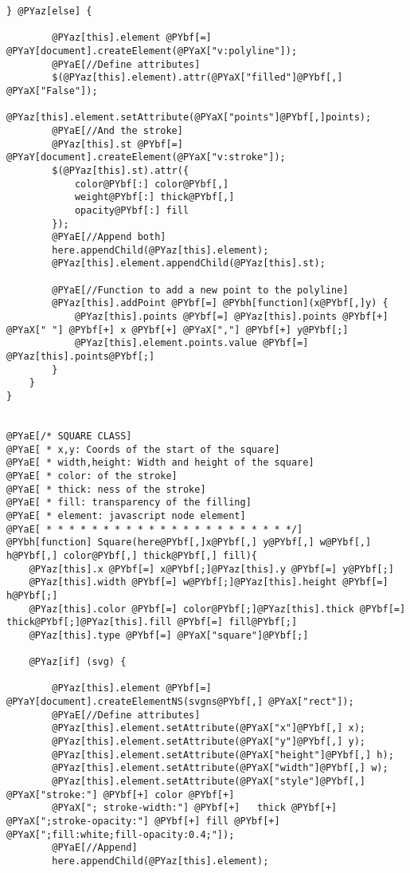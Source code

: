 \begin{Verbatim}[commandchars=@\[\]]
    } @PYaz[else] {
		
        @PYaz[this].element @PYbf[=] @PYaY[document].createElement(@PYaX["v:polyline"]);
		@PYaE[//Define attributes]
        $(@PYaz[this].element).attr(@PYaX["filled"]@PYbf[,] @PYaX["False"]);
        @PYaz[this].element.setAttribute(@PYaX["points"]@PYbf[,]points);
		@PYaE[//And the stroke]
        @PYaz[this].st @PYbf[=] @PYaY[document].createElement(@PYaX["v:stroke"]);
        $(@PYaz[this].st).attr({
            color@PYbf[:] color@PYbf[,]
            weight@PYbf[:] thick@PYbf[,]
            opacity@PYbf[:] fill
        });
		@PYaE[//Append both]
		here.appendChild(@PYaz[this].element);
		@PYaz[this].element.appendChild(@PYaz[this].st);
		
		@PYaE[//Function to add a new point to the polyline]
		@PYaz[this].addPoint @PYbf[=] @PYbh[function](x@PYbf[,]y) {
			@PYaz[this].points @PYbf[=] @PYaz[this].points @PYbf[+] @PYaX[" "] @PYbf[+] x @PYbf[+] @PYaX[","] @PYbf[+] y@PYbf[;]
			@PYaz[this].element.points.value @PYbf[=] @PYaz[this].points@PYbf[;]
		}
    }
}


@PYaE[/* SQUARE CLASS]
@PYaE[ * x,y: Coords of the start of the square]
@PYaE[ * width,height: Width and height of the square]
@PYaE[ * color: of the stroke]
@PYaE[ * thick: ness of the stroke]
@PYaE[ * fill: transparency of the filling]
@PYaE[ * element: javascript node element]
@PYaE[ * * * * * * * * * * * * * * * * * * * * * */]
@PYbh[function] Square(here@PYbf[,]x@PYbf[,] y@PYbf[,] w@PYbf[,] h@PYbf[,] color@PYbf[,] thick@PYbf[,] fill){
	@PYaz[this].x @PYbf[=] x@PYbf[;]@PYaz[this].y @PYbf[=] y@PYbf[;]
	@PYaz[this].width @PYbf[=] w@PYbf[;]@PYaz[this].height @PYbf[=] h@PYbf[;]
	@PYaz[this].color @PYbf[=] color@PYbf[;]@PYaz[this].thick @PYbf[=] thick@PYbf[;]@PYaz[this].fill @PYbf[=] fill@PYbf[;]
	@PYaz[this].type @PYbf[=] @PYaX["square"]@PYbf[;]
	
	@PYaz[if] (svg) {
		
		@PYaz[this].element @PYbf[=] @PYaY[document].createElementNS(svgns@PYbf[,] @PYaX["rect"]);
		@PYaE[//Define attributes]
		@PYaz[this].element.setAttribute(@PYaX["x"]@PYbf[,] x);
		@PYaz[this].element.setAttribute(@PYaX["y"]@PYbf[,] y);
		@PYaz[this].element.setAttribute(@PYaX["height"]@PYbf[,] h);
		@PYaz[this].element.setAttribute(@PYaX["width"]@PYbf[,] w);
		@PYaz[this].element.setAttribute(@PYaX["style"]@PYbf[,] @PYaX["stroke:"] @PYbf[+] color @PYbf[+]
		@PYaX["; stroke-width:"] @PYbf[+]	thick @PYbf[+] @PYaX[";stroke-opacity:"] @PYbf[+] fill @PYbf[+] @PYaX[";fill:white;fill-opacity:0.4;"]);
		@PYaE[//Append]
		here.appendChild(@PYaz[this].element);
		

\end{Verbatim}
